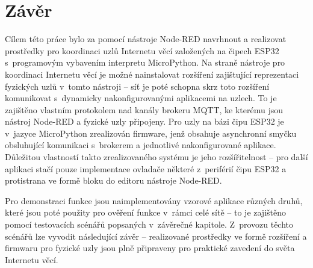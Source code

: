 \chapter{Závěr}
\label{ch:zaver}

Cílem této práce bylo za pomocí nástroje Node-RED navrhnout a realizovat prostředky pro koordinaci uzlů Internetu věcí
založených na čipech ESP32 s~programovým vybavením interpretu MicroPython.
Na straně nástroje pro koordinaci Internetu věcí je možné nainstalovat rozšíření zajištující reprezentaci fyzických
uzlů v~tomto nástroji
-- síť je poté schopna skrz toto rozšíření komunikovat s~dynamicky nakonfigurovanými aplikacemi na uzlech.
To je zajištěno vlastním protokolem nad kanály brokeru MQTT, ke kterému jsou nástroj Node-RED a fyzické uzly připojeny.
Pro uzly na bázi čipu ESP32 je v~jazyce MicroPython zrealizován firmware, jenž obsahuje asynchronní smyčku
obsluhující komunikaci s~brokerem a jednotlivé nakonfigurované aplikace.
Důležitou vlastností takto zrealizovaného systému je jeho rozšířitelnost -- pro další aplikaci stačí pouze implementace
ovladače některé z~periférií čipu ESP32 a protistrana ve formě bloku do editoru nástroje Node-RED.

Pro demonstraci funkce jsou naimplementovány vzorové aplikace různých druhů, které jsou poté použity pro ověření
funkce v~rámci celé sítě -- to je zajištěno pomocí testovacích scénářů popsaných v~závěrečné kapitole.
Z~provozu těchto scénářů lze vyvodit následující závěr -- realizované prostředky ve formě rozšíření a firmwaru pro
fyzické uzly jsou plně připraveny pro praktické zavedení do světa Internetu věcí.